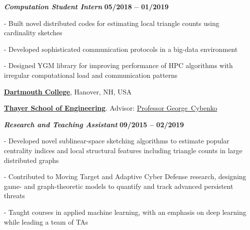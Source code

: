 \begin{outerlist}
\begin{innerlist}
\end{innerlist}

\item[] \textbf{\textit{Computation Student Intern}}%
\hfill \textbf{05/2018 -- 01/2019}

\begin{innerlist}

\item[-] Built novel distributed codes for estimating local triangle counts using cardinality sketches

\item[-] Developed sophisticated communication protocols in a big-data environment

\item[-] Designed YGM library for improving performance of HPC algorithms with irregular computational load and communication patterns

\end{innerlist}
\end{outerlist}





\halfblankline




\href{https://dartmouth.edu}{\textbf{Dartmouth College}},
Hanover, NH, USA

\href{https://engineering.dartmouth.edu/}{\textbf{Thayer School of Engineering}}.
Advisor:               
\href{http://www.dartmouth.edu/~gvc/}
{Professor George~Cybenko}

\vspace{-0.5em}

\begin{outerlist}

\item[] \textbf{\textit{Research and Teaching Assistant}}%
\hfill \textbf{09/2015 -- 02/2019}

\begin{innerlist}

\item[-] Developed novel sublinear-space sketching algorithms to estimate popular centrality indices and local structural features including triangle counts in large distributed graphs 

\item[-] Contributed to Moving Target and Adaptive Cyber Defense research, designing game- and graph-theoretic models to quantify and track advanced persistent threats

\item[-] Taught courses in applied machine learning, with an emphasis on deep learning while leading a team of TAs

\end{innerlist}
\end{outerlist}



